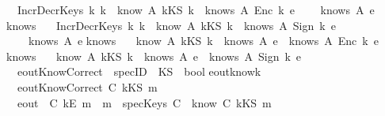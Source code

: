 \begin{isabellebody}
\ \ {\isachardoublequoteopen}{\isacharparenleft}IncrDecrKeys\ k{}\ k{}{\isacharparenright}\ {\isasymand}\ {\isacharparenleft}know\ A\ {\isacharparenleft}kKS\ k{}{\isacharparenright}{\isacharparenright}\ {\isasymand}\ {\isacharparenleft}knows\ A\ {\isacharparenleft}Enc\ k{}\ e{\isacharparenright}{\isacharparenright}\isanewline
\ \ \ {\isasymlongrightarrow}\ knows\ A\ e{\isachardoublequoteclose}\ \isanewline
{}\isanewline
knows{}{\isacharcolon}\ \isanewline
\ \ {\isachardoublequoteopen}{\isacharparenleft}IncrDecrKeys\ k{}\ k{}{\isacharparenright}\ {\isasymand}\ {\isacharparenleft}know\ A\ {\isacharparenleft}kKS\ k{}{\isacharparenright}{\isacharparenright}\ {\isasymand}\ {\isacharparenleft}knows\ A\ {\isacharparenleft}Sign\ k{}\ e{\isacharparenright}{\isacharparenright}\isanewline
\ \ \ {\isasymlongrightarrow}\ knows\ A\ e{\isachardoublequoteclose}\isanewline
{}\isanewline
knows{}{\isacharcolon}\ \isanewline
\ \ {\isachardoublequoteopen}{\isacharparenleft}know\ A\ {\isacharparenleft}kKS\ k{\isacharparenright}{\isacharparenright}\ {\isasymand}\ {\isacharparenleft}knows\ A\ e{}{\isacharparenright}\ {\isasymlongrightarrow}\ knows\ A\ {\isacharparenleft}Enc\ k\ e{}{\isacharparenright}{\isachardoublequoteclose}\isanewline
{}\isanewline
knows{}{\isacharcolon}\ \isanewline
\ \ {\isachardoublequoteopen}{\isacharparenleft}know\ A\ {\isacharparenleft}kKS\ k{\isacharparenright}{\isacharparenright}\ {\isasymand}\ {\isacharparenleft}knows\ A\ e{}{\isacharparenright}\ {\isasymlongrightarrow}\ knows\ A\ {\isacharparenleft}Sign\ k\ e{}{\isacharparenright}{\isachardoublequoteclose}\isanewline
\isanewline
{}\isamarkupfalse%
\ \ eoutKnowCorrect\ {\isacharcolon}{\isacharcolon}\ {\isachardoublequoteopen}specID\ {\isasymRightarrow}\ KS\ {\isasymRightarrow}\ bool{\isachardoublequoteclose}\isanewline
{}\isanewline
eout{\isacharunderscore}know{\isacharunderscore}k{\isacharcolon}\ \isanewline
\ \ {\isachardoublequoteopen}eoutKnowCorrect\ C\ {\isacharparenleft}kKS\ m{\isacharparenright}\ {\isacharequal}\ \isanewline
\ \ {\isacharparenleft}{\isacharparenleft}eout\ \ C\ {\isacharparenleft}kE\ m{\isacharparenright}{\isacharparenright}\ {\isasymlongleftrightarrow}\ {\isacharparenleft}m\ {\isasymin}\ {\isacharparenleft}specKeys\ C{\isacharparenright}\ {\isasymor}\ {\isacharparenleft}know\ C\ {\isacharparenleft}kKS\ m{\isacharparenright}{\isacharparenright}{\isacharparenright}\ {\isacharparenright}{\isachardoublequoteclose}\ \ {\isacharbar}\isanewline

\end{isabellebody}
